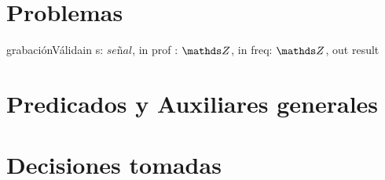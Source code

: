 \documentclass[a4paper]{article}
\begin{document}
\newcommand{\senial}{\textit{se\~nal}}


\maketitle

\section{Problemas}
\begin{proc}{grabaci\'onV\'alida}{in s: $\senial$, in prof : $\ent$, in freq: $\ent$, out result}{}
    \pre{\True}
    \post{\True}
\end{proc}

\section{Predicados y Auxiliares generales}

\section{Decisiones tomadas}
\end{document}
